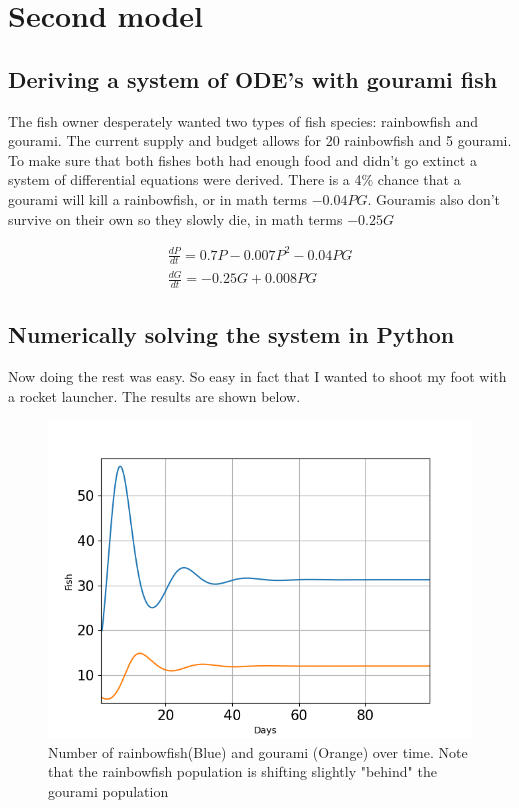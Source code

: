 \section{Second model}

\subsection{Deriving a system of ODE's with gourami fish}
\begin{flushleft}
    The fish owner desperately wanted two types of fish species:
    rainbowfish and gourami. The current supply and budget allows for 20 rainbowfish and 5 gourami.
    To make sure that both fishes both had enough food and didn't go extinct a system of differential equations were derived.
    There is a 4\% chance that a gourami will kill a rainbowfish, or in math terms $-0.04PG$.
    Gouramis also don't survive on their own so they slowly die, in math terms $-0.25G$
\end{flushleft}

\begin{align*}[left = \empheqlbrace]
    \frac{dP}{dt}= 0.7P-0.007P^2-0.04PG \\
    \frac{dG}{dt} = -0.25G+0.008PG
\end{align*}

\subsection{Numerically solving the system in Python}
\begin{flushleft}
    Now doing the rest was easy. So easy in fact that I wanted to shoot my foot
    with a rocket launcher. The results are shown below.

\end{flushleft}
\begin{figure}[H]
    \includegraphics[scale=0.4]{../figures/Figure_2.png}
    \centering
    \caption{Number of rainbowfish(Blue) and gourami (Orange) over time. Note that the
        rainbowfish population is shifting slightly "behind" the gourami population}
    \label{two}
\end{figure}

